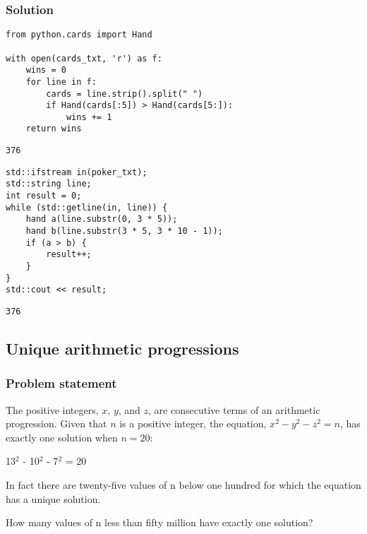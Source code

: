 \documentclass[11pt]{article}
\begin{document}
\subsubsection{Solution}
\label{sec:orgheadline16}
\begin{verbatim}
from python.cards import Hand

with open(cards_txt, 'r') as f:
    wins = 0
    for line in f:
        cards = line.strip().split(" ")
        if Hand(cards[:5]) > Hand(cards[5:]):
            wins += 1
    return wins
\end{verbatim}

\begin{verbatim}
376
\end{verbatim}

\begin{verbatim}
std::ifstream in(poker_txt);
std::string line;
int result = 0;
while (std::getline(in, line)) {
    hand a(line.substr(0, 3 * 5));
    hand b(line.substr(3 * 5, 3 * 10 - 1));
    if (a > b) {
        result++;
    }
}
std::cout << result;
\end{verbatim}

\begin{verbatim}
376
\end{verbatim}
\subsection{Unique arithmetic progressions}
\label{sec:orgheadline20}
\subsubsection{Problem statement}
\label{sec:orgheadline18}
The positive integers, \(x\), \(y\), and \(z\), are consecutive terms of an
arithmetic progression.  Given that \(n\) is a positive integer, the equation,
\(x^2-y^2-z^2 = n\), has exactly one solution when \(n = 20\):

13\(^{\text{2}}\) - 10\(^{\text{2}}\) - 7\(^{\text{2}}\) = 20

In fact there are twenty-five values of n below one hundred for which the
equation has a unique solution.

How many values of n less than fifty million have exactly one solution?
\end{document}
